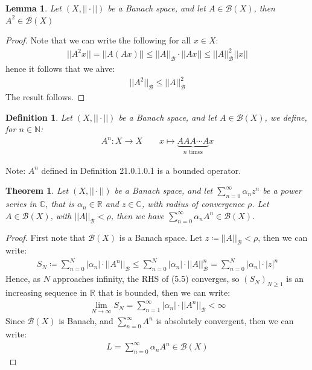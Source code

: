 \documentclass[11pt]{book}
\theoremstyle{break}
\theoremstyle{break}
\newtheorem{thm}{Theorem}[section]
\newtheorem{lem}{Lemma}[thm]
\newtheorem{defn}{Definition}[corL]
\newcommand{\R}{\mathbb{R}}
\newcommand{\N}{\mathbb{N}}
\newcommand{\C}{\mathbb{C}}
\newcommand{\note}{\color{red}Note: \color{black}}
\begin{document}
\begin{lem}
Let $(X, ||\cdot ||)$ be a Banach space, and let $A \in  \mathcal{B}(X)$, then $A^2 \in \mathcal{B}(X)$
\end{lem}
\begin{proof}
Note that we can write the following for all $x\in X$:
\begin{align*}
||A^2x|| = ||A(Ax)|| \leq ||A||_{\mathcal{B}}\cdot ||Ax|| \leq ||A||_{\mathcal{B}}^2||x|| 
\end{align*}
hence it follows that we  ahve:
\begin{align*}
||A^2||_{\mathcal{B}} \leq ||A||_{\mathcal{B}}^2 
\end{align*}
The result follows. 
\end{proof}

\begin{defn}
Let $(X, ||\cdot ||)$ be a Banach space, and let $A \in  \mathcal{B}(X)$, we define, for $n \in \N$:
\begin{align*}
A^n: X \to X \qquad x\mapsto \underbrace{AAA\cdots A}_{n \text{ times}} x
\end{align*}
\end{defn}
\note $A^n$ defined in Definition 21.0.1.0.1 is a bounded operator.\\


\begin{thm}
Let $(X,||\cdot ||)$ be a Banach space, and let $\sum_{n=0}^\infty  \alpha_n z^n$ be a power series in $\C$, that is $\alpha_n \in \R$ and $z \in \C$, with radius of convergence $\rho$. Let $A \in \mathcal{B}(X)$, with $||A||_{\mathcal{B}}<\rho$, then we have $\sum_{n=0}^\infty \alpha_n A^n \in \mathcal{B}(X)$.
\end{thm}
\begin{proof}
First note that $\mathcal{B}(X)$ is a Banach space. Let $z \coloneqq ||A||_{\mathcal{B}} <  \rho$, then we can write:
\begin{align}
S_N \coloneqq \sum_{n=0}^N |\alpha_n |\cdot ||A^n||_{\mathcal{B}} \leq \sum_{n=0}^N |\alpha_n | \cdot ||A||^n_{\mathcal{B}} = \sum_{n=0}^N |\alpha_n |\cdot |z|^n
\end{align}
Hence, as $N$ approaches infinity, the RHS of (5.5) converges, so $(S_N)_{N \geq 1}$ is an increasing sequence in $\R$ that is bounded, then we can write:
\begin{align*}
\lim_{N \to \infty}S_N = \sum_{n=1}^\infty |\alpha_n| \cdot ||A^n||_{\mathcal{B}} < \infty
\end{align*}
Since $\mathcal{B}(X)$ is Banach, and $\sum_{n=0}^\infty A^n$ is absolutely convergent, then we can write:
\begin{align*}
L = \sum_{n=0}^\infty \alpha_n A^n \in \mathcal{B}(X)
\end{align*}
\end{proof}
\end{document}
